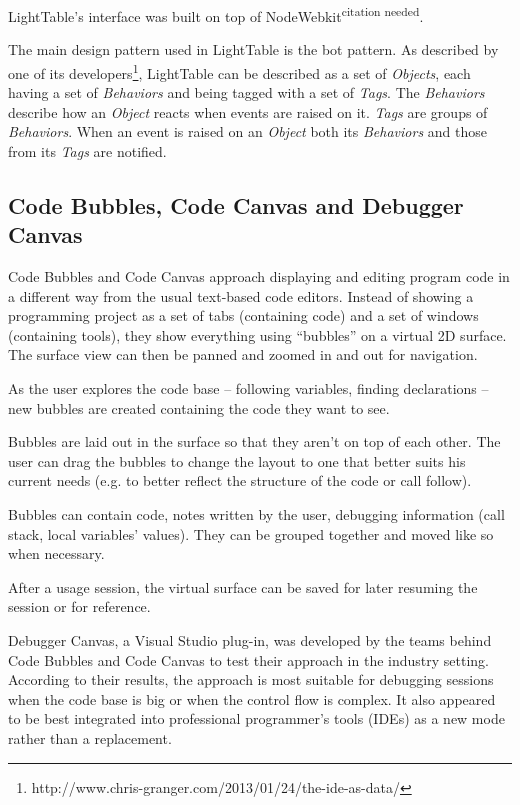 \documentclass{./llncs2e/llncs}
\begin{document}
	LightTable's interface was built on top of NodeWebkit\textsuperscript{citation needed}.

	The main design pattern used in LightTable is the \ac{bot} pattern. 
	As described by one of its developers\footnote{http://www.chris-granger.com/2013/01/24/the-ide-as-data/}, LightTable can be described as a set of \emph{Objects}, each having a set of \emph{Behaviors} and being tagged with a set of \emph{Tags}. 
	The \emph{Behaviors} describe how an \emph{Object} reacts when events are raised on it. \emph{Tags} are groups of \emph{Behaviors}. 
	When an event is raised on an \emph{Object} both its \emph{Behaviors} and those from its \emph{Tags} are notified.


\subsection{Code Bubbles, Code Canvas and Debugger Canvas}
	Code Bubbles and Code Canvas approach displaying and editing program code in a different way from the usual text-based code editors.
	Instead of showing a programming project as a set of tabs (containing code) and a set of windows (containing tools), they show everything using ``bubbles'' on a virtual 2D surface. 
	The surface view can then be panned and zoomed in and out for navigation.

	As the user explores the code base -- following variables, finding declarations -- new bubbles are created containing the code they want to see.

	Bubbles are laid out in the surface so that they aren't on top of each other. 
	The user can drag the bubbles to change the layout to one that better suits his current needs (e.g. to better reflect the structure of the code or call follow).

	Bubbles can contain code, notes written by the user, debugging information (call stack, local variables' values). 
	They can be grouped together and moved like so when necessary.

	After a usage session, the virtual surface can be saved for later resuming the session or for reference.

	Debugger Canvas, a Visual Studio plug-in, was developed by the teams behind Code Bubbles and Code Canvas to test their approach in the industry setting. 
	According to their results, the approach is most suitable for debugging sessions when the code base is big or when the control flow is complex. 
	It also appeared to be best integrated into professional programmer's tools (IDEs) as a new mode rather than a replacement.
\end{document}
